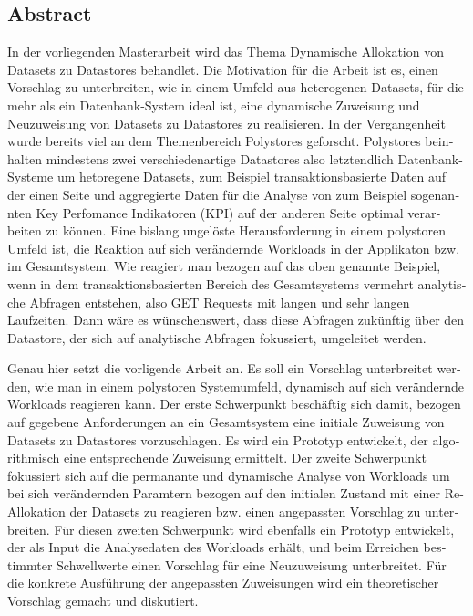 

\begin{otherlanguage}{american}
	\chapter*{Abstract}
	In der vorliegenden Masterarbeit wird das Thema Dynamische Allokation von Datasets zu 
	Datastores behandlet.
	Die Motivation für die Arbeit ist es, einen Vorschlag zu unterbreiten, wie in einem Umfeld aus 
	heterogenen Datasets, für die mehr als ein Datenbank-System ideal ist, eine
	dynamische Zuweisung und Neuzuweisung von Datasets zu Datastores zu realisieren.
	In der Vergangenheit wurde bereits viel an dem Themenbereich Polystores geforscht.
	Polystores beinhalten mindestens zwei verschiedenartige Datastores also letztendlich
	Datenbank-Systeme um hetoregene Datasets, zum Beispiel transaktionsbasierte Daten auf der
	einen Seite und aggregierte Daten für die Analyse von zum Beispiel sogenannten Key Perfomance
	Indikatoren (KPI) auf der anderen Seite optimal verarbeiten zu können.
	Eine bislang ungelöste Herausforderung in einem polystoren Umfeld ist, die Reaktion auf sich 
	verändernde Workloads in der Applikaton bzw. im Gesamtsystem. Wie reagiert man bezogen auf das oben genannte Beispiel, wenn in dem 
	transaktionsbasierten Bereich des Gesamtsystems vermehrt analytische 
	Abfragen entstehen, also GET Requests mit langen und sehr langen Laufzeiten. Dann wäre 
	es wünschenswert, dass diese Abfragen zukünftig über den Datastore, der sich auf 
	analytische Abfragen fokussiert, umgeleitet werden. \newline

	\noindent
	Genau hier setzt die vorligende Arbeit an. Es soll ein Vorschlag unterbreitet werden, wie man 
	in einem polystoren Systemumfeld, dynamisch auf sich verändernde Workloads reagieren kann.
	Der erste Schwerpunkt beschäftig sich damit, bezogen auf gegebene Anforderungen an 
	ein Gesamtsystem eine initiale Zuweisung von Datasets zu Datastores vorzuschlagen.
	Es wird ein Prototyp entwickelt, der algorithmisch eine entsprechende Zuweisung ermittelt.
	Der zweite Schwerpunkt fokussiert sich auf die permanante und dynamische Analyse von Workloads
	um bei sich verändernden Paramtern bezogen auf den initialen Zustand mit einer Re-Allokation
	der Datasets zu reagieren bzw. einen angepassten Vorschlag zu unterbreiten.  Für diesen 
	zweiten Schwerpunkt wird ebenfalls ein Prototyp entwickelt, der als Input die Analysedaten 
	des Workloads erhält, und beim Erreichen bestimmter Schwellwerte einen Vorschlag für eine Neuzuweisung
	unterbreitet. 
	Für die konkrete Ausführung der angepassten Zuweisungen wird ein theoretischer Vorschlag gemacht und diskutiert.\newline


\end{otherlanguage}
